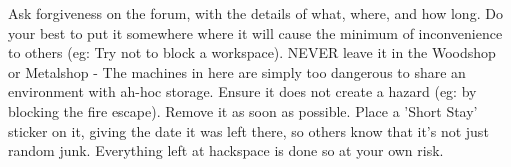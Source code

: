 {{Ask forgiveness on the forum, with the details of what, where, and how long.
Do your best to put it somewhere where it will cause the minimum of inconvenience to others (eg: Try not to block a workspace).
NEVER leave it in the Woodshop or Metalshop - The machines in here are simply too dangerous to share an environment with ah-hoc storage.
Ensure it does not create a hazard (eg: by blocking the fire escape).
Remove it as soon as possible.
Place a 'Short Stay' sticker on it, giving the date it was left there, so others know that it's not just random junk.} %
	}
	{%
	Everything left at hackspace is done so at your own risk.
	}
